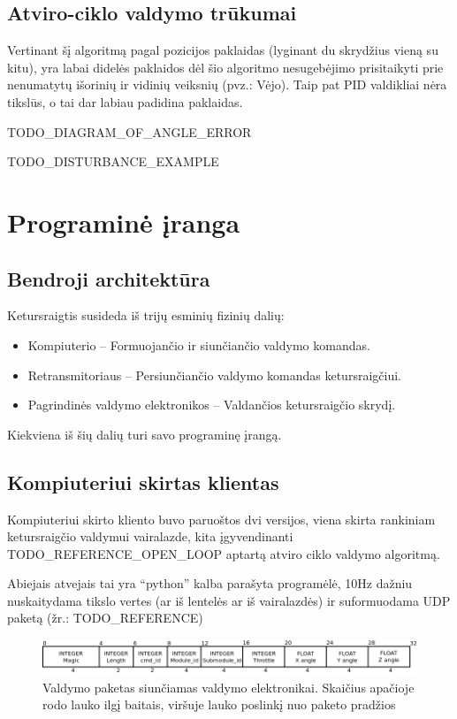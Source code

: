 \documentclass[12pt, a4paper, lithuanian, final]{article}
\begin{document}
\subsection{Atviro-ciklo valdymo trūkumai}

Vertinant šį algoritmą pagal pozicijos paklaidas (lyginant du skrydžius vieną su kitu), yra labai didelės paklaidos dėl šio algoritmo nesugebėjimo prisitaikyti prie nenumatytų išorinių ir vidinių veiksnių (pvz.: Vėjo).
Taip pat PID valdikliai nėra tikslūs, o tai dar labiau padidina paklaidas.

TODO\_DIAGRAM\_OF\_ANGLE\_ERROR

TODO\_DISTURBANCE\_EXAMPLE


\section{Programinė įranga}
\subsection{Bendroji architektūra}

Ketursraigtis susideda iš trijų esminių fizinių dalių:
\begin{itemize}
	\item Kompiuterio -- Formuojančio ir siunčiančio valdymo komandas.
	\item Retransmitoriaus -- Persiunčiančio valdymo komandas ketursraigčiui.
	\item Pagrindinės valdymo elektronikos -- Valdančios ketursraigčio skrydį.
\end{itemize}

Kiekviena iš šių dalių turi savo programinę įrangą.

\subsection{Kompiuteriui skirtas klientas}

Kompiuteriui skirto kliento buvo paruoštos dvi versijos, viena skirta rankiniam ketursraigčio valdymui vairalazde, kita įgyvendinanti TODO\_REFERENCE\_OPEN\_LOOP aptartą atviro ciklo valdymo algoritmą.

Abiejais atvejais tai yra "`python"' kalba parašyta programėlė, 10Hz dažniu nuskaitydama tikslo vertes (ar iš lentelės ar iš vairalazdės) ir suformuodama UDP paketą (žr.: TODO\_REFERENCE)

\begin{figure}[H]
\begin{center}
\includegraphics[width=1.0\textwidth]{img/ctrl_packet.png}
\caption{Valdymo paketas siunčiamas valdymo elektronikai. Skaičius apačioje rodo lauko ilgį baitais, viršuje lauko poslinkį nuo paketo pradžios}
\end{center}
\end{figure}
\end{document}
